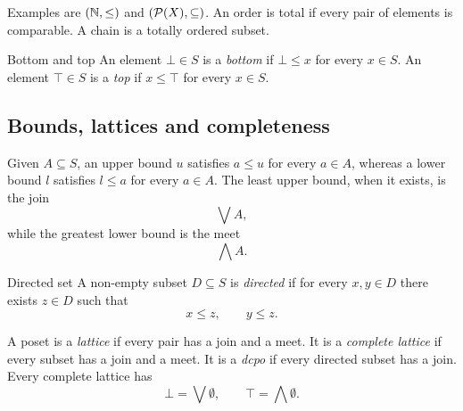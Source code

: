 \documentclass[a4paper]{article}
\begin{document}
Examples are \((\mathbb{N},\leq)\) and \((\mathcal P(X),\subseteq)\).
An order is total if every pair of elements is comparable. A chain is a totally ordered subset.

\begin{snippetdefinition}{Bottom and top}
    An element \(\bot\in S\) is a \emph{bottom} if \(\bot\leq x\) for every \(x\in S\).
    An element \(\top\in S\) is a \emph{top} if \(x\leq\top\) for every \(x\in S\).
\end{snippetdefinition}

\subsection{Bounds, lattices and completeness}

\begin{center}
\end{center}

Given \(A\subseteq S\), an upper bound \(u\) satisfies \(a\leq u\) for every \(a\in A\), whereas a lower bound \(l\) satisfies \(l\leq a\) for every \(a\in A\).
The least upper bound, when it exists, is the join
\[
    \bigvee A,
\]
while the greatest lower bound is the meet
\[
    \bigwedge A.
\]

\begin{snippetdefinition}{Directed set}
    A non-empty subset \(D\subseteq S\) is \emph{directed} if for every \(x,y\in D\) there exists \(z\in D\) such that
    \[
        x\leq z,
        \qquad
        y\leq z.
    \]
\end{snippetdefinition}

A poset is a \emph{lattice} if every pair has a join and a meet.
It is a \emph{complete lattice} if every subset has a join and a meet.
It is a \emph{dcpo} if every directed subset has a join.
Every complete lattice has
\[
    \bot=\bigvee\emptyset,
    \qquad
    \top=\bigwedge\emptyset.
\]
\end{document}
